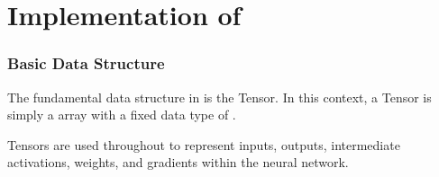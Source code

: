 \part{Implementation of \mfnet}

\section{Basic Data Structure}

The fundamental data structure in \mfnet is the Tensor. In this context, a Tensor is simply a 
array with a fixed data type of . 

Tensors are used throughout \mfnet to represent inputs, outputs, intermediate activations, weights, and
gradients within the neural network.
